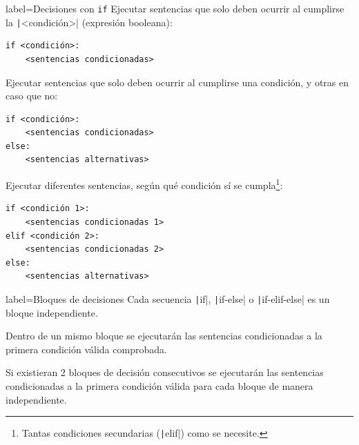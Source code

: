 \begin{contentbox}{label=Decisiones con \texttt{if}}
    Ejecutar sentencias que solo deben ocurrir al cumplirse la \texttt|<condición>| (\alert{expresión booleana}):
\begin{verbatim}
if <condición>:
    <sentencias condicionadas>
\end{verbatim}

    Ejecutar sentencias que solo deben ocurrir al cumplirse una condición, y otras en caso que no:
\begin{verbatim}
if <condición>:
    <sentencias condicionadas>
else:
    <sentencias alternativas>
\end{verbatim}

    Ejecutar diferentes sentencias, según qué condición sí se cumpla\footnote{Tantas condiciones secundarias (\texttt|elif|) como se necesite.}:
\begin{verbatim}
if <condición 1>:
    <sentencias condicionadas 1>
elif <condición 2>:
    <sentencias condicionadas 2>
else:
    <sentencias alternativas>
\end{verbatim}
\end{contentbox}

\begin{contentbox}{label=Bloques de decisiones}
    Cada secuencia \texttt|if|, \texttt|if-else| o \texttt|if-elif-else| es un bloque independiente.
    
    Dentro de un mismo bloque se ejecutarán las sentencias condicionadas a la primera condición válida comprobada.
    
    Si existieran 2 bloques de decisión consecutivos se ejecutarán las sentencias condicionadas a la primera condición válida para cada bloque de manera independiente.
\end{contentbox}

